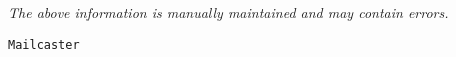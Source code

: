 \label{pkg:mailcaster}

{\tiny \it The above information is manually maintained and may contain errors.}
\begin{verbatim}
Mailcaster
\end{verbatim}
